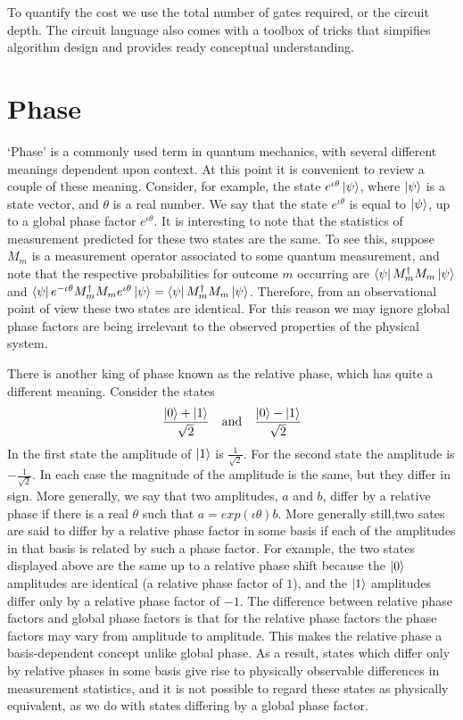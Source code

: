 To quantify the cost we use the total number of gates required, or the circuit depth. The circuit language also comes with a toolbox of tricks that simpifies algorithm design and provides ready conceptual understanding.

\section{Phase}
`Phase' is a commonly used term in quantum mechanics, with several different meanings dependent upon context. At this point it is convenient to review a couple of these meaning. Consider, for example, the state $e^{\iota \theta}\ket{\psi}$, where $\ket{\psi}$ is a state vector, and $\theta$ is a real number. We say that the state $e^{\iota \theta}$ is equal to $\ket{\psi}$, up to a global phase factor $e^{\iota \theta}$. It is interesting to note that the statistics of measurement predicted for these two states are the same. To see this, suppose $M_m$ is a measurement operator associated to some quantum measurement, and note that the respective probabilities for outcome $m$ occurring are $\bra{\psi}M_m^{\dagger}M_m\ket{\psi}$ and $\bra{\psi}e^{-\iota \theta}M_m^{\dagger} M_m e^{\iota \theta} \ket{\psi}=\bra{\psi}M_m^{\dagger}M_m\ket{\psi}$. Therefore, from an observational point of view these two states are identical. For this reason we may ignore global phase factors are being irrelevant to the observed properties of the physical system.

There is another king of phase known as the relative phase, which has quite a different meaning. Consider the states
\[
\frac{\ket{0}+\ket{1}}{\sqrt{2}}\quad \text{and} \quad \frac{\ket{0}-\ket{1}}{\sqrt{2}}
\]
In the first state the amplitude of $\ket{1}$ is $\frac{1}{\sqrt{2}}$. For the second state the amplitude is $-\frac{1}{\sqrt{2}}$. In each case the magnitude of the amplitude is the same, but they differ in sign. More generally, we say that two amplitudes, $a$ and $b$, differ by a relative phase if there is a real $\theta$ such that $a=exp(\iota \theta)b$. More generally still,two sates are said to differ by a relative phase factor in some basis if each of the amplitudes in that basis is related by such a phase factor. For example, the two states displayed above are the same up to a relative phase shift because the $\ket{0}$ amplitudes are identical (a relative phase factor of $1$), and the $\ket{1}$ amplitudes differ only by a relative phase factor of $-1$. The difference between relative phase factors and global phase factors is that for the relative phase factors the phase factors may vary from amplitude to amplitude. This makes the relative phase a basis-dependent concept unlike global phase. As a result, states which differ only by relative phases in some basis give rise to physically observable differences in measurement statistics, and it is not possible to regard these states as physically equivalent, as we do with states differing by a global phase factor.

